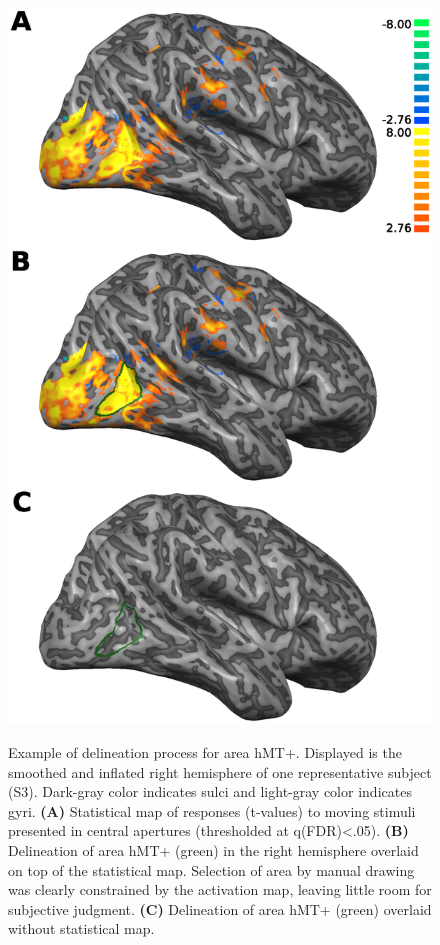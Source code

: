 \begin{figure}[htb!]
\captionsetup{labelformat=empty}
\centering
\includegraphics[width=\textwidth]{figures/chapter_03_SI/figS1.eps}
\caption{}
\end{figure}

\begin{figure}[ht!]
\ContinuedFloat
\captionsetup{labelformat=adja-page}
\caption{Example of delineation process for area hMT+. Displayed is the smoothed and inflated right hemisphere of one representative subject (S3). Dark-gray color indicates sulci and light-gray color indicates gyri. \textbf{(A)} Statistical map of responses (t-values) to moving stimuli presented in central apertures (thresholded at q(FDR)\textless.05). \textbf{(B)} Delineation of area hMT+ (green) in the right hemisphere overlaid on top of the statistical map. Selection of area by manual drawing was clearly constrained by the activation map, leaving little room for subjective judgment. \textbf{(C)} Delineation of area hMT+ (green) overlaid without statistical map.}
\label{fig:figD_roiSel}
\noindent\hrulefill
\end{figure}

